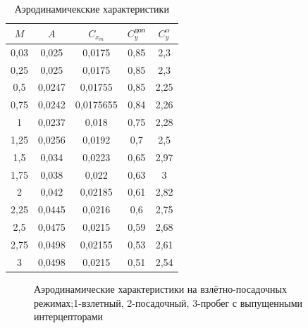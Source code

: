 \begin{table}[H]
    \centering
    \caption{Аэродинамичекские характеристики }
    \label{tab:Аэродинамичекские характеристики }
    \begin{tabular}{|c||c|c|c|c|}
    \hline
        $M$  & $A$  & $C_{x_{m}}$  & $C_y^{\text{доп}}$  & $C_y^{\alpha}$   \\ \hline \hline
        0,03  & 0,025  & 0,0175  & 0,85  & 2,3   \\ \hline
        0,25  & 0,025  & 0,0175  & 0,85  & 2,3  \\ \hline
        0,5  & 0,0247  & 0,01755  & 0,85  & 2,25  \\ \hline
        0,75  & 0,0242  & 0,0175655  & 0,84  & 2,26  \\ \hline
        1  & 0,0237  & 0,018  & 0,75  & 2,28  \\ \hline
        1,25  & 0,0256  & 0,0192  & 0,7  & 2,5   \\ \hline
        1,5  & 0,034  & 0,0223  & 0,65  & 2,97  \\ \hline
        1,75  & 0,038  & 0,022  & 0,63  & 3  \\ \hline
        2  & 0,042  & 0,02185  & 0,61  & 2,82   \\ \hline
        2,25  & 0,0445  & 0,0216  & 0,6  & 2,75   \\ \hline
        2,5  & 0,0475  & 0,0215  & 0,59  & 2,68  \\ \hline
        2,75  & 0,0498  & 0,02155  & 0,53  & 2,61   \\ \hline
        3 & 0,0498  & 0,0215  & 0,51  & 2,54   \\ \hline
    \end{tabular}
\end{table}

\begin{figure}[H]
    \caption{Аэродинамические характеристики на взлётно-посадочных
режимах;1-взлетный, 2-посадочный, 3-пробег с выпущенными
интерцепторами}
    \label{fig:ИД Взлёт посадка}
\end{figure}

